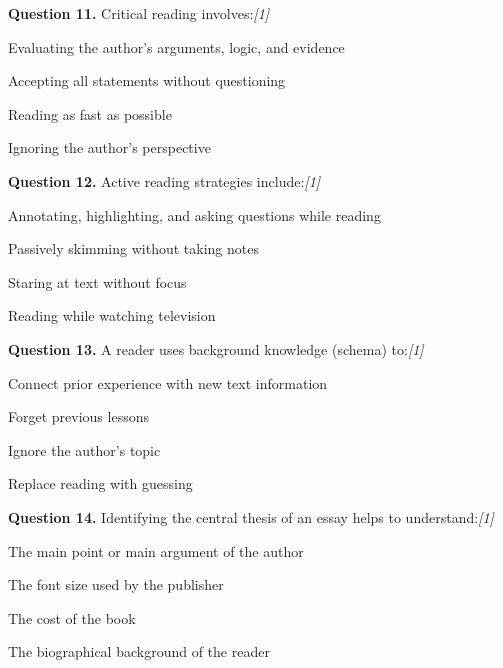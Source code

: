\documentclass[11pt,a4paper]{article}
\newcommand{\pts}[1]{\hfill   \textit{[#1]}}
\begin{document}
\medskip




\noindent   \textbf{Question 11.} Critical reading involves:\pts{1}

\begin{parts}
  \item Evaluating the author's arguments, logic, and evidence
  \item Accepting all statements without questioning
  \item Reading as fast as possible
  \item Ignoring the author's perspective
\end{parts}

\medskip




\noindent   \textbf{Question 12.} Active reading strategies include:\pts{1}

\begin{parts}
  \item Annotating, highlighting, and asking questions while reading
  \item Passively skimming without taking notes
  \item Staring at text without focus
  \item Reading while watching television
\end{parts}

\medskip




\noindent   \textbf{Question 13.} A reader uses background knowledge (schema) to:\pts{1}

\begin{parts}
  \item Connect prior experience with new text information
  \item Forget previous lessons
  \item Ignore the author's topic
  \item Replace reading with guessing
\end{parts}

\medskip




\noindent   \textbf{Question 14.} Identifying the central thesis of an essay helps to understand:\pts{1}

\begin{parts}
  \item The main point or main argument of the author
  \item The font size used by the publisher
  \item The cost of the book
  \item The biographical background of the reader
\end{parts}
\end{document}
